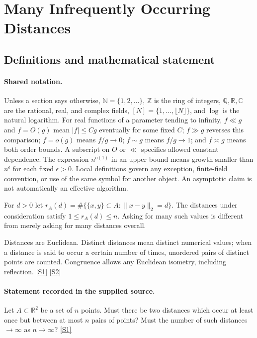 \documentclass[11pt,a4paper]{article}
\newcommand{\N}{\mathbb{N}}
\newcommand{\Z}{\mathbb{Z}}
\newcommand{\Q}{\mathbb{Q}}
\newcommand{\R}{\mathbb{R}}
\newcommand{\C}{\mathbb{C}}
\newcommand{\sref}[2]{\hyperlink{source:#1:#2}{[S#2]}}
\begin{document}
\section{Many Infrequently Occurring Distances}\label{statement}


\subsection{Definitions and mathematical statement}

\paragraph{Shared notation.}Unless a section says otherwise, $\N=\{1,2,\ldots\}$,
$\Z$ is the ring of integers, $\Q,\R,\C$ are the rational, real, and complex
fields, $[N]=\{1,\ldots,\lfloor N\rfloor\}$, and $\log$ is the natural
logarithm. For real functions of a parameter tending to infinity,
$f\ll g$ and $f=O(g)$ mean $|f|\leq Cg$ eventually for some fixed $C$;
$f\gg g$ reverses this comparison; $f=o(g)$ means $f/g\to0$;
$f\sim g$ means $f/g\to1$; and $f\asymp g$ means both order bounds.
A subscript on $O$ or $\ll$ specifies allowed constant dependence.
The expression $n^{o(1)}$ in an upper bound means growth smaller than
$n^\epsilon$ for each fixed $\epsilon>0$. Local definitions govern any
exception, finite-field convention, or use of the same symbol for another
object. An asymptotic claim is not automatically an effective algorithm.



For $d>0$ let $r_A(d)=\#\{\{x,y\}\subset A:\|x-y\|_2=d\}$. The distances under consideration satisfy $1\leq r_A(d)\leq n$. Asking for many such values is different from merely asking for many distances overall.

Distances are Euclidean. Distinct distances mean distinct numerical values; when a distance is said to occur a certain number of times, unordered pairs of distinct points are counted. Congruence allows any Euclidean isometry, including reflection. \sref{statement}{1} \sref{statement}{2}

\paragraph{Statement recorded in the supplied source.}
Let $A\subset \mathbb{R}^2$ be a set of $n$ points. Must there be two distances which occur at least once but between at most $n$ pairs of points? Must the number of such distances $\to \infty$ as $n\to \infty$? \sref{statement}{1}
\end{document}
